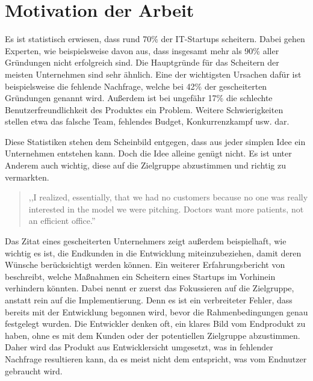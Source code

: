 \section{Motivation der Arbeit}
Es ist statistisch erwiesen, dass rund 70\% der IT-Startups scheitern.  \cite{CBInsights_failure} Dabei gehen Experten, wie beispielsweise  davon aus, dass insgesamt mehr als 90\% aller Gründungen nicht erfolgreich sind. Die Hauptgründe für das Scheitern der meisten Unternehmen sind sehr ähnlich. Eine der wichtigsten Ursachen dafür ist beispielsweise die fehlende Nachfrage, welche bei 42\% der gescheiterten Gründungen genannt wird. Außerdem ist bei ungefähr 17\% die schlechte Benutzerfreundlichkeit des Produktes ein Problem. Weitere Schwierigkeiten stellen etwa das falsche Team, fehlendes Budget, Konkurrenzkampf usw. dar. \cite{CBInsights_reasons} 

Diese Statistiken stehen dem Scheinbild entgegen, dass aus jeder simplen Idee ein Unternehmen entstehen kann. Doch die Idee alleine genügt nicht. Es ist unter Anderem auch wichtig, diese auf die Zielgruppe abzustimmen und richtig zu vermarkten. 
\begin{quote}
,,I realized, essentially, that we had no customers because no one was really interested in the model we were pitching. Doctors want more patients, not an efficient office.'' \cite{CBInsights_reasons}
\end{quote}
Das Zitat eines gescheiterten Unternehmers zeigt außerdem beispielhaft, wie wichtig es ist, die Endkunden in die Entwicklung miteinzubeziehen, damit deren Wünsche berücksichtigt werden können. Ein weiterer Erfahrungsbericht von  beschreibt, welche Maßnahmen ein Scheitern eines Startups im Vorhinein verhindern könnten. Dabei nennt er zuerst das Fokussieren auf die Zielgruppe, anstatt rein auf die Implementierung. Denn es ist ein verbreiteter Fehler, dass bereits mit der Entwicklung begonnen wird, bevor die Rahmenbedingungen genau festgelegt wurden. Die Entwickler denken oft, ein klares Bild vom Endprodukt zu haben, ohne es mit dem Kunden oder der potentiellen Zielgruppe abzustimmen. Daher wird das Produkt aus Entwicklersicht umgesetzt, was in fehlender Nachfrage resultieren kann, da es meist nicht dem entspricht, was vom Endnutzer gebraucht wird.

